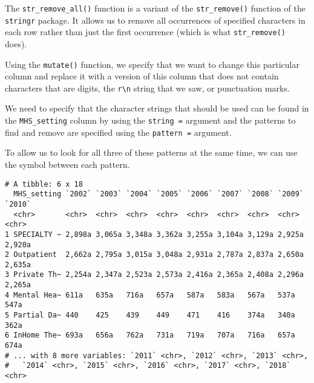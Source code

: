 \documentclass[
]{article}
\newenvironment{Shaded}{\begin{snugshade}}{\end{snugshade}}
\newcommand{\CharTok}[1]{\textcolor[rgb]{0.31,0.60,0.02}{#1}}
\newcommand{\DataTypeTok}[1]{\textcolor[rgb]{0.13,0.29,0.53}{#1}}
\newcommand{\FloatTok}[1]{\textcolor[rgb]{0.00,0.00,0.81}{#1}}
\newcommand{\KeywordTok}[1]{\textcolor[rgb]{0.13,0.29,0.53}{\textbf{#1}}}
\newcommand{\NormalTok}[1]{#1}
\newcommand{\OperatorTok}[1]{\textcolor[rgb]{0.81,0.36,0.00}{\textbf{#1}}}
\newcommand{\StringTok}[1]{\textcolor[rgb]{0.31,0.60,0.02}{#1}}
\begin{document}
The \texttt{str\_remove\_all()} function is a variant of the
\texttt{str\_remove()} function of the \texttt{stringr} package. It
allows us to remove all occurrences of specified characters in each row
rather than just the first occurrence (which is what
\texttt{str\_remove()} does).

Using the \texttt{mutate()} function, we specify that we want to change
this particular column and replace it with a version of this column that
does not contain characters that are digits, the
\texttt{r\textbackslash{}n} string that we saw, or punctuation marks.

We need to specify that the character strings that should be used can be
found in the \texttt{MHS\_setting} column by using the
\texttt{string\ =} argument and the patterns to find and remove are
specified using the \texttt{pattern\ =} argument.

To allow us to look for all three of these patterns at the same time, we
can use the \texttt{\textbar{}} symbol between each pattern.

\begin{Shaded}
\end{Shaded}

\begin{verbatim}
# A tibble: 6 x 18
  MHS_setting `2002` `2003` `2004` `2005` `2006` `2007` `2008` `2009` `2010`
  <chr>       <chr>  <chr>  <chr>  <chr>  <chr>  <chr>  <chr>  <chr>  <chr> 
1 SPECIALTY ~ 2,898a 3,065a 3,348a 3,362a 3,255a 3,104a 3,129a 2,925a 2,920a
2 Outpatient  2,662a 2,795a 3,015a 3,048a 2,931a 2,787a 2,837a 2,650a 2,635a
3 Private Th~ 2,254a 2,347a 2,523a 2,573a 2,416a 2,365a 2,408a 2,296a 2,265a
4 Mental Hea~ 611a   635a   716a   657a   587a   583a   567a   537a   547a  
5 Partial Da~ 440    425    439    449    471    416    374a   340a   362a  
6 InHome The~ 693a   656a   762a   731a   719a   707a   716a   657a   674a  
# ... with 8 more variables: `2011` <chr>, `2012` <chr>, `2013` <chr>,
#   `2014` <chr>, `2015` <chr>, `2016` <chr>, `2017` <chr>, `2018` <chr>
\end{verbatim}
\end{document}
